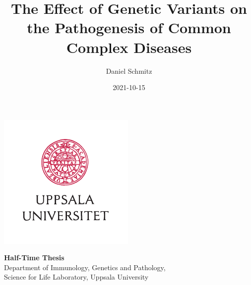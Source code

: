 \documentclass[draft]{scrbook}
\title{The Effect of Genetic Variants on the Pathogenesis of Common Complex Diseases}
\author{Daniel Schmitz}
\date{2021-10-15}
\begin{document}
\frontmatter
\newlength{\oldparindent}
\setlength{\oldparindent}{\parindent}

\parskip 6pt
\parindent 0pt

\begin{titlepage}
    \centering
    \makeatletter
    \LARGE \sffamily \@title

    \Large \rmfamily \@author

    \vspace*{\fill}
    \includegraphics[width=.5\pagewidth]{img/UU_logo_4f_42.pdf}

    \vspace*{\fill}
    \normalsize
    \textbf{Half-Time Thesis} \\
    Department of Immunology, Genetics and Pathology,\\
    Science for Life Laboratory, Uppsala University

    \@date
    \makeatother
\end{titlepage}
\end{document}

